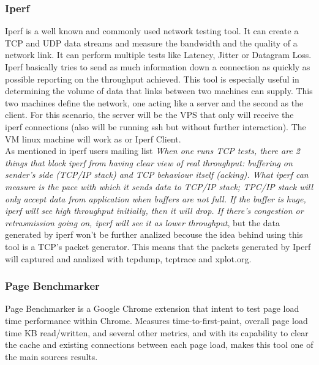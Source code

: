 \subsubsection{Iperf}
Iperf is a well known and commonly used network testing tool. It can create a
TCP and UDP data streams and measure the bandwidth and the quality of a network
link. It can perform multiple tests like Latency, Jitter or Datagram Loss.\\

Iperf basically tries to send as much information down a connection as quickly
as possible reporting on the throughput achieved. This tool is especially useful
in determining the volume of data that links between two machines can supply.
This two machines define the network, one acting like a server and the second as
the client. For this scenario, the server will be the VPS that only will receive
the iperf connections (also will be running ssh but without further
interaction). The VM linux machine will work as or Iperf Client.\\  

As mentioned in iperf users mailing list \textit{
When one runs TCP tests, there are 2 things that block iperf from having clear
view of real throughput: buffering on sender's side (TCP/IP stack) and TCP
behaviour itself (acking). What iperf can measure is the pace with which it
sends data to TCP/IP stack; TPC/IP stack will only accept data from application
when buffers are not full. If the buffer is huge, iperf will see high
throughput initially, then it will drop. If there's congestion or retrasmission
going on, iperf will see it as lower throughput}\cite{iperfmaillist}, but the
data generated by iperf won't be further analized becouse the  idea behind using
this tool is a TCP's packet generator. This means that the packets generated by 
Iperf will captured and analized with tcpdump, tcptrace and xplot.org.\\

\subsubsection{Page Benchmarker}

Page Benchmarker is a Google Chrome extension that intent to test page load 
time performance within Chrome. Measures time-to-first-paint, overall page load 
time KB read/written, and several other metrics, and with its capability to 
clear the cache and existing connections between each page load, makes this 
tool one of the main sources results.\\

